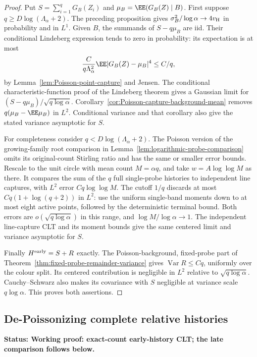 \documentclass[11pt,letterpaper]{article}
\newcommand{\status}[1]{\textbf{Status: #1.}}
\begin{document}
\begin{proof}
Put $S=\sum_{i=1}^qG_B(Z_i)$ and
$\mu_B=\EE(G_B(Z)\mid B)$. First suppose
$q\ge D\log(\Lambda_\alpha+2)$. The preceding proposition
gives $\sigma_B^2/\log\alpha\to4v_{\rm H}$ in probability
and in $L^1$. Given $B$, the summands of $S-q\mu_B$ are iid.
Their conditional Lindeberg expression tends to zero in
probability: its expectation is at most
\[
 \frac{C}{q\Lambda_\alpha^2}
       \EE|G_B(Z)-\mu_B|^4\le C/q,
\]
by Lemma~\ref{lem:Poisson-point-capture} and Jensen.
The conditional characteristic-function proof of the
Lindeberg theorem gives a Gaussian limit for
$(S-q\mu_B)/\sqrt{q\log\alpha}$. Corollary~\ref{cor:Poisson-capture-background-mean}
removes $q(\mu_B-\EE\mu_B)$ in $L^2$. Conditional variance
and that corollary also give the stated variance asymptotic
for $S$.

For completeness consider $q<D\log(\Lambda_\alpha+2)$.
The Poisson version of the growing-family root comparison
in Lemma~\ref{lem:logarithmic-probe-comparison} omits its
original-count Stirling ratio and has the same or smaller
error bounds. Rescale to the unit circle with mean count
$M=\alpha q$, and take $w=A\log\log M$ as there. It compares
the sum of the $q$ full single-probe histories to independent
line captures, with $L^2$ error $Cq\log\log M$.
The cutoff $1/q$ discards at most $Cq(1+\log(q+2))$ in
$L^2$: use the uniform single-band moments down to at most
eight active points, followed by the deterministic terminal
bound. Both errors are $o(\sqrt{q\log\alpha})$ in this range,
and $\log M/\log\alpha\to1$. The independent line-capture
CLT and its moment bounds give the same centered limit and
variance asymptotic for $S$.

Finally $H^{\rm early}=S+R$ exactly. The Poisson-background,
fixed-probe part of
Theorem~\ref{thm:fixed-probe-remainder-variance} gives
$\operatorname{Var}R\le Cq$, uniformly over the colour split.
Its centered contribution is negligible in $L^2$ relative
to $\sqrt{q\log\alpha}$. Cauchy--Schwarz also makes its
covariance with $S$ negligible at variance scale $q\log\alpha$.
This proves both assertions.
\end{proof}

\subsection{De-Poissonizing complete relative histories}
\label{sec:relative-history-depoisson}

\status{Working proof: exact-count early-history CLT; the late comparison follows below}
\end{document}
